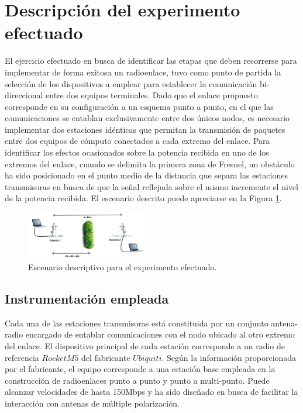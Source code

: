 \documentclass[conference]{IEEEtran}
\begin{document}
\section{Descripción del experimento efectuado}
El ejercicio efectuado en busca de identificar las etapas que deben recorrerse para implementar de forma exitosa un radioenlace, tuvo como 
punto de partida la selección de los dispositivos a emplear para establecer la comunicación bi-direccional entre dos equipos terminales. Dado que el 
enlace propuesto corresponde en su configuración a un esquema punto a punto, en el que las comunicaciones se entablan exclusivamente entre dos
únicos nodos, es necesario implementar dos estaciones idénticas que permitan la transmisión de paquetes entre dos equipos de cómputo conectados
a cada extremo del enlace. Para identificar los efectos ocasionados sobre la potencia recibida en uno de los extremos del enlace, cuando se delimita
la primera zona de Fresnel, un obstáculo ha sido posicionado en el punto medio de la distancia que separa las estaciones transmisoras en busca de que
la señal reflejada sobre el mismo incremente el nivel de la potencia recibida. El escenario descrito puede apreciarse en la Figura \ref{fig:Escenario}.
\begin{figure}
    \centering
          \includegraphics[width=0.47\textwidth]{Escenario.png}
        \caption{Escenario descriptivo para el experimento efectuado.
        }
        \label{fig:Escenario}
\end{figure}
\subsection{Instrumentación empleada}
Cada una de las estaciones transmisoras está constituida por un conjunto antena-radio encargado de entablar comunicaciones con el nodo ubicado al 
otro extremo del enlace. El dispositivo principal de cada estación corresponde a un radio de referencia $Rocket M5$ del fabricante $Ubiquiti$. Según la 
información proporcionada por el fabricante, el equipo corresponde a una estación base empleada en la construcción de radioenlaces punto a punto y
punto a multi-punto. Puede alcanzar velocidades de hasta 150Mbps y ha sido diseñado en busca de facilitar la interacción con antenas de múltiple polarización.
\end{document}
